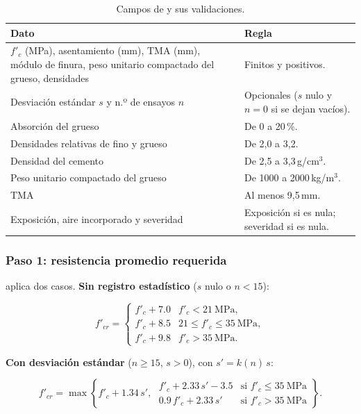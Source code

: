 \begin{table}[H]
	\centering
	\caption{Campos de  y sus validaciones.}
	\label{tab:con-entrada-aci}
	\begin{tabular}{L{5.4cm}L{8.2cm}}
		\hline
		\textbf{Dato} & \textbf{Regla} \\ \hline
		$f'_c$ (MPa), asentamiento (mm), TMA (mm), módulo de finura, peso unitario compactado del grueso, densidades &
		Finitos y positivos. \\
		Desviación estándar $s$ y n.º de ensayos $n$ & Opcionales ($s$ nulo y $n = 0$ si se dejan vacíos). \\
		Absorción del grueso & De 0 a 20\,\%. \\
		Densidades relativas de fino y grueso & De 2,0 a 3,2. \\
		Densidad del cemento & De 2,5 a 3,3\,g/cm$^3$. \\
		Peso unitario compactado del grueso & De 1000 a 2000\,kg/m$^3$. \\
		TMA & Al menos 9,5\,mm. \\
		Exposición, aire incorporado y severidad & Exposición  si es nula; severidad  si es
		nula. \\
		\hline
	\end{tabular}
\end{table}

\subsubsection{Paso 1: resistencia promedio requerida}

 aplica dos casos. \textbf{Sin registro estadístico} ($s$ nulo o $n < 15$):

\begin{equation}
	f'_{cr} =
	\begin{cases}
		f'_c + 7.0 & f'_c < 21\ \text{MPa},\\
		f'_c + 8.5 & 21 \le f'_c \le 35\ \text{MPa},\\
		f'_c + 9.8 & f'_c > 35\ \text{MPa}.
	\end{cases}
	\label{eq:con-fcr-sin}
\end{equation}

\textbf{Con desviación estándar} ($n \ge 15$, $s > 0$), con $s' = k(n)\,s$:

\begin{equation}
	f'_{cr} = \max\left\{ f'_c + 1.34\, s',\;
	\begin{array}{ll}
		f'_c + 2.33\, s' - 3.5 & \text{si } f'_c \le 35\ \text{MPa}\\
		0.9\, f'_c + 2.33\, s' & \text{si } f'_c > 35\ \text{MPa}
	\end{array}
	\right\} .
	\label{eq:con-fcr-con}
\end{equation}

